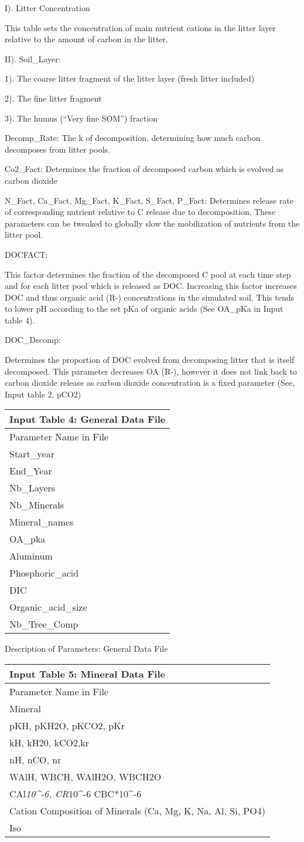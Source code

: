 \documentclass[
]{article}
\begin{document}
I). Litter Concentration

This table sets the concentration of main nutrient cations in the litter
layer relative to the amount of carbon in the litter.

II). Soil\_Layer:

1). The coarse litter fragment of the litter layer (fresh litter
included)

2). The fine litter fragment

3). The humus (``Very fine SOM'') fraction

Decomp\_Rate: The k of decomposition, determining how much carbon
decomposes from litter pools.

Co2\_Fact: Determines the fraction of decomposed carbon which is evolved
as carbon dioxide

N\_Fact, Ca\_Fact, Mg\_Fact, K\_Fact, S\_Fact, P\_Fact: Determines
release rate of corresponding nutrient relative to C release due to
decomposition. These parameters can be tweaked to globally slow the
mobilization of nutrients from the litter pool.

DOCFACT:

This factor determines the fraction of the decomposed C pool at each
time step and for each litter pool which is released as DOC. Increasing
this factor increases DOC and thus organic acid (R-) concentrations in
the simulated soil. This tends to lower pH according to the set pKa of
organic acids (See OA\_pKa in Input table 4).

DOC\_Decomp:

Determines the proportion of DOC evolved from decomposing litter that is
itself decomposed. This parameter decreases OA (R-), however it does not
link back to carbon dioxide release as carbon dioxide concentration is a
fixed parameter (See, Input table 2, pCO2)

\begin{longtable}[]{@{}l@{}}
\toprule
Input Table 4: General Data File\tabularnewline
\midrule
\endhead
Parameter Name in File\tabularnewline
Start\_year\tabularnewline
End\_Year\tabularnewline
Nb\_Layers\tabularnewline
Nb\_Minerals\tabularnewline
Mineral\_names\tabularnewline
OA\_pka\tabularnewline
Aluminum\tabularnewline
Phosphoric\_acid\tabularnewline
DIC\tabularnewline
Organic\_acid\_size\tabularnewline
Nb\_Tree\_Comp\tabularnewline
\bottomrule
\end{longtable}

Description of Parameters: General Data File

\begin{longtable}[]{@{}l@{}}
\toprule
Input Table 5: Mineral Data File\tabularnewline
\midrule
\endhead
Parameter Name in File\tabularnewline
Mineral\tabularnewline
pKH, pKH2O, pKCO2, pKr\tabularnewline
kH, kH20, kCO2,kr\tabularnewline
nH, nCO, nr\tabularnewline
WAlH, WBCH, WAlH2O, WBCH2O\tabularnewline
CAl\emph{10\^{}-6, CR}10\^{}-6 CBC*10\^{}-6\tabularnewline
Cation Composition of Minerals (Ca, Mg, K, Na, Al, Si,
PO4)\tabularnewline
Iso\tabularnewline
\bottomrule
\end{longtable}
\end{document}
